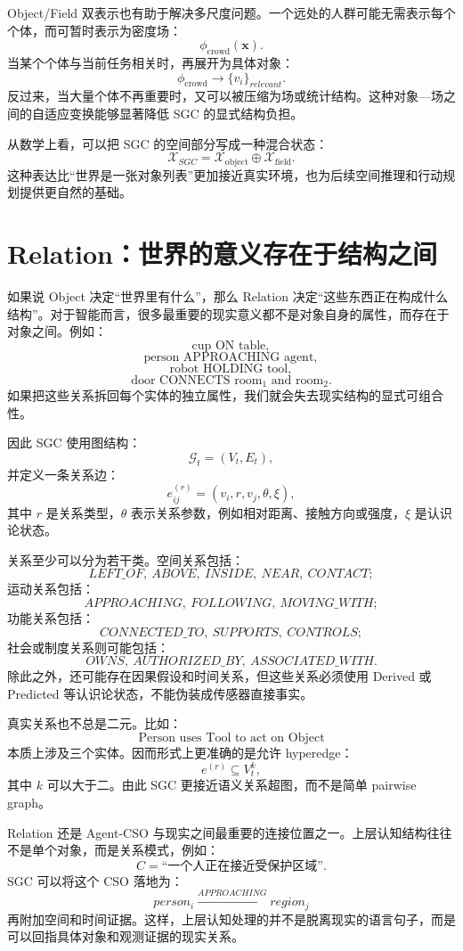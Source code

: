 Object/Field 双表示也有助于解决多尺度问题。一个远处的人群可能无需表示每个个体，而可暂时表示为密度场：
\[
\phi_{\mathrm{crowd}}(\mathbf x).
\]
当某个个体与当前任务相关时，再展开为具体对象：
\[
\phi_{\mathrm{crowd}}
\rightarrow
\{v_i\}_{relevant}.
\]
反过来，当大量个体不再重要时，又可以被压缩为场或统计结构。这种对象—场之间的自适应变换能够显著降低 SGC 的显式结构负担。

从数学上看，可以把 SGC 的空间部分写成一种混合状态：
\[
\boxed{
\mathcal X_{SGC}
=
\mathcal X_{\mathrm{object}}
\oplus
\mathcal X_{\mathrm{field}} .
}
\]
这种表达比“世界是一张对象列表”更加接近真实环境，也为后续空间推理和行动规划提供更自然的基础。

\section{Relation：世界的意义存在于结构之间}

如果说 Object 决定“世界里有什么”，那么 Relation 决定“这些东西正在构成什么结构”。对于智能而言，很多最重要的现实意义都不是对象自身的属性，而存在于对象之间。例如：
\[
\text{cup ON table},
\]
\[
\text{person APPROACHING agent},
\]
\[
\text{robot HOLDING tool},
\]
\[
\text{door CONNECTS room}_1\text{ and room}_2 .
\]
如果把这些关系拆回每个实体的独立属性，我们就会失去现实结构的显式可组合性。

因此 SGC 使用图结构：
\[
\mathcal G_t=(V_t,E_t),
\]
并定义一条关系边：
\[
e_{ij}^{(r)}
=
(
v_i,
r,
v_j,
\theta,
\xi
),
\]
其中 $r$ 是关系类型，$\theta$ 表示关系参数，例如相对距离、接触方向或强度，$\xi$ 是认识论状态。

关系至少可以分为若干类。空间关系包括：
\[
LEFT\_OF,\ ABOVE,\ INSIDE,\ NEAR,\ CONTACT;
\]
运动关系包括：
\[
APPROACHING,\ FOLLOWING,\ MOVING\_WITH;
\]
功能关系包括：
\[
CONNECTED\_TO,\ SUPPORTS,\ CONTROLS;
\]
社会或制度关系则可能包括：
\[
OWNS,\ AUTHORIZED\_BY,\ ASSOCIATED\_WITH.
\]
除此之外，还可能存在因果假设和时间关系，但这些关系必须使用 Derived 或 Predicted 等认识论状态，不能伪装成传感器直接事实。

真实关系也不总是二元。比如：
\[
\text{Person uses Tool to act on Object}
\]
本质上涉及三个实体。因而形式上更准确的是允许 hyperedge：
\[
e^{(r)}
\subseteq
V_t^{k},
\]
其中 $k$ 可以大于二。由此 SGC 更接近语义关系超图，而不是简单 pairwise graph。

Relation 还是 Agent-CSO 与现实之间最重要的连接位置之一。上层认知结构往往不是单个对象，而是关系模式，例如：
\[
C=
\text{“一个人正在接近受保护区域”}.
\]
SGC 可以将这个 CSO 落地为：
\[
person_i
\xrightarrow{APPROACHING}
region_j
\]
再附加空间和时间证据。这样，上层认知处理的并不是脱离现实的语言句子，而是可以回指具体对象和观测证据的现实关系。

